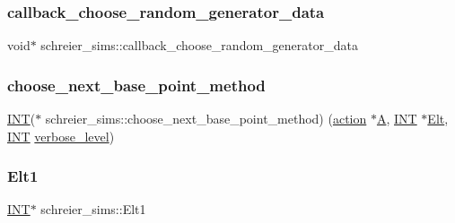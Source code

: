\subsubsection{\texorpdfstring{callback\+\_\+choose\+\_\+random\+\_\+generator\+\_\+data}{callback\_choose\_random\_generator\_data}}
{\footnotesize\ttfamily void$\ast$ schreier\+\_\+sims\+::callback\+\_\+choose\+\_\+random\+\_\+generator\+\_\+data}

\mbox{\label{classschreier__sims_a8639b48a416a69dc88c6a1d89aafdc26}} 
\subsubsection{\texorpdfstring{choose\+\_\+next\+\_\+base\+\_\+point\+\_\+method}{choose\_next\_base\_point\_method}}
{\footnotesize\ttfamily \mbox{\hyperlink{galois_8h_a09fddde158a3a20bd2dcadb609de11dc}{I\+NT}}($\ast$ schreier\+\_\+sims\+::choose\+\_\+next\+\_\+base\+\_\+point\+\_\+method) (\mbox{\hyperlink{classaction}{action}} $\ast$\mbox{\hyperlink{simeon_8_c_a97833f04c3a9c008df5521a2fc291bb4}{A}}, \mbox{\hyperlink{galois_8h_a09fddde158a3a20bd2dcadb609de11dc}{I\+NT}} $\ast$\mbox{\hyperlink{simeon_8_c_aec1406935bdb1fee3561fcb840964100}{Elt}}, \mbox{\hyperlink{galois_8h_a09fddde158a3a20bd2dcadb609de11dc}{I\+NT}} \mbox{\hyperlink{simeon_8_c_a818073fbcc2f439e7c56952f67386122}{verbose\+\_\+level}})}

\mbox{\label{classschreier__sims_a96702aa4fe1cc0d2e225de54c451e2d8}} 
\subsubsection{\texorpdfstring{Elt1}{Elt1}}
{\footnotesize\ttfamily \mbox{\hyperlink{galois_8h_a09fddde158a3a20bd2dcadb609de11dc}{I\+NT}}$\ast$ schreier\+\_\+sims\+::\+Elt1}

\mbox{\label{classschreier__sims_a99141364981c07557ee0b24fa5dd0a95}} 
